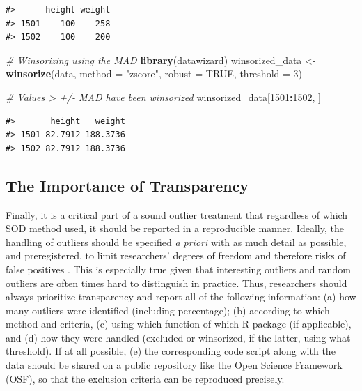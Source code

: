 \documentclass[sn-basic, lineno,pdflatex]{sn-jnl}
\newenvironment{Shaded}{\begin{snugshade}}{\end{snugshade}}
\newcommand{\AttributeTok}[1]{\textcolor[rgb]{0.13,0.29,0.53}{#1}}
\newcommand{\CommentTok}[1]{\textcolor[rgb]{0.56,0.35,0.01}{\textit{#1}}}
\newcommand{\ConstantTok}[1]{\textcolor[rgb]{0.56,0.35,0.01}{#1}}
\newcommand{\DecValTok}[1]{\textcolor[rgb]{0.00,0.00,0.81}{#1}}
\newcommand{\FunctionTok}[1]{\textcolor[rgb]{0.13,0.29,0.53}{\textbf{#1}}}
\newcommand{\NormalTok}[1]{#1}
\newcommand{\OtherTok}[1]{\textcolor[rgb]{0.56,0.35,0.01}{#1}}
\newcommand{\SpecialCharTok}[1]{\textcolor[rgb]{0.81,0.36,0.00}{\textbf{#1}}}
\newcommand{\StringTok}[1]{\textcolor[rgb]{0.31,0.60,0.02}{#1}}
\begin{document}
\begin{verbatim}
#>      height weight
#> 1501    100    258
#> 1502    100    200
\end{verbatim}

\begin{Shaded}
\begin{Highlighting}[]
\CommentTok{\# Winsorizing using the MAD}
\FunctionTok{library}\NormalTok{(datawizard)}
\NormalTok{winsorized\_data }\OtherTok{\textless{}{-}} \FunctionTok{winsorize}\NormalTok{(data, }\AttributeTok{method =} \StringTok{"zscore"}\NormalTok{, }\AttributeTok{robust =} \ConstantTok{TRUE}\NormalTok{, }\AttributeTok{threshold =} \DecValTok{3}\NormalTok{)}

\CommentTok{\# Values \textgreater{} +/{-} MAD have been winsorized}
\NormalTok{winsorized\_data[}\DecValTok{1501}\SpecialCharTok{:}\DecValTok{1502}\NormalTok{, ]}
\end{Highlighting}
\end{Shaded}

\begin{verbatim}
#>       height   weight
#> 1501 82.7912 188.3736
#> 1502 82.7912 188.3736
\end{verbatim}

\hypertarget{the-importance-of-transparency}{%
\subsection{The Importance of
Transparency}\label{the-importance-of-transparency}}

Finally, it is a critical part of a sound outlier treatment that
regardless of which SOD method used, it should be reported in a
reproducible manner. Ideally, the handling of outliers should be
specified \emph{a priori} with as much detail as possible, and
preregistered, to limit researchers' degrees of freedom and therefore
risks of false positives \citep{leys2019outliers}. This is especially
true given that interesting outliers and random outliers are often times
hard to distinguish in practice. Thus, researchers should always
prioritize transparency and report all of the following information: (a)
how many outliers were identified (including percentage); (b) according
to which method and criteria, (c) using which function of which R
package (if applicable), and (d) how they were handled (excluded or
winsorized, if the latter, using what threshold). If at all possible,
(e) the corresponding code script along with the data should be shared
on a public repository like the Open Science Framework (OSF), so that
the exclusion criteria can be reproduced precisely.
\end{document}

